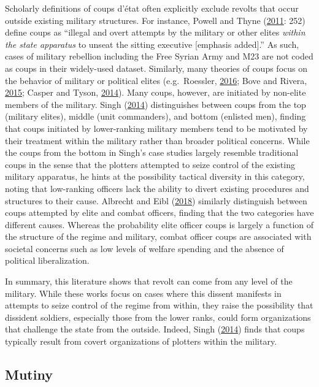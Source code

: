\documentclass[
  12pt,
]{article}
\begin{document}
Scholarly definitions of coups d'état often explicitly exclude revolts that occur outside existing military structures. For instance, Powell and Thyne (\protect\hyperlink{ref-Powell2011}{2011}: 252) define coups as ``illegal and overt attempts by the military or other elites \emph{within the state apparatus} to unseat the sitting executive {[}emphasis added{]}.'' As such, cases of military rebellion including the Free Syrian Army and M23 are not coded as coups in their widely-used dataset. Similarly, many theories of coups focus on the behavior of military or political elites (e.g.~Roessler, \protect\hyperlink{ref-Roessler2016}{2016}; Bove and Rivera, \protect\hyperlink{ref-Bove2015a}{2015}; Casper and Tyson, \protect\hyperlink{ref-Casper2014}{2014}). Many coups, however, are initiated by non-elite members of the military. Singh (\protect\hyperlink{ref-Singh2014}{2014}) distinguishes between coups from the top (military elites), middle (unit commanders), and bottom (enlisted men), finding that coups initiated by lower-ranking military members tend to be motivated by their treatment within the military rather than broader political concerns. While the coups from the bottom in Singh's case studies largely resemble traditional coups in the sense that the plotters attempted to seize control of the existing military apparatus, he hints at the possibility tactical diversity in this category, noting that low-ranking officers lack the ability to divert existing procedures and structures to their cause. Albrecht and Eibl (\protect\hyperlink{ref-Albrecht2018a}{2018}) similarly distinguish between coups attempted by elite and combat officers, finding that the two categories have different causes. Whereas the probability elite officer coups is largely a function of the structure of the regime and military, combat officer coups are associated with societal concerns such as low levels of welfare spending and the absence of political liberalization.

In summary, this literature shows that revolt can come from any level of the military. While these works focus on cases where this dissent manifests in attempts to seize control of the regime from within, they raise the possibility that dissident soldiers, especially those from the lower ranks, could form organizations that challenge the state from the outside. Indeed, Singh (\protect\hyperlink{ref-Singh2014}{2014}) finds that coups typically result from covert organizations of plotters within the military.

\hypertarget{mutiny}{%
\subsection{Mutiny}\label{mutiny}}
\end{document}
